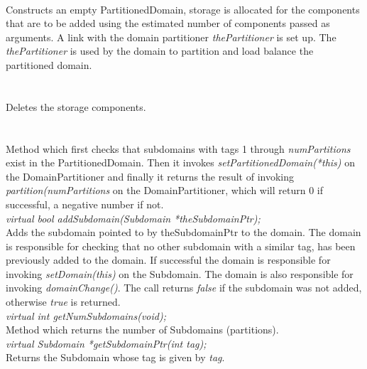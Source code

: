  \\ 
Constructs an empty PartitionedDomain, storage is allocated for the components
that are to be added using the estimated number of components passed
as arguments. A link with the domain partitioner {\em thePartitioner}
is set up. The {\em thePartitioner} is used by the domain to partition
and load balance the partitioned domain. \\


  \\
  \\
Deletes the storage components. \\

  \\
\\
Method which first checks that subdomains with tags 1 through {\em numPartitions} exist in the 
PartitionedDomain. Then it invokes {\em setPartitionedDomain(*this)} on the DomainPartitioner
and finally it returns the result of invoking {\em partition(numPartitions} on
the DomainPartitioner, which will return 0 if successful, a negative number if not. \\

{\em virtual bool addSubdomain(Subdomain *theSubdomainPtr);}  \\
Adds the subdomain pointed to by theSubdomainPtr to the domain. The domain
is responsible for checking that no other subdomain with a similar tag,
has been previously added to the domain. If successful
the domain is responsible for invoking {\em setDomain(this)} on the
Subdomain. The domain is also responsible for invoking {\em
domainChange()}. The call returns {\em false} if the subdomain was not added, 
otherwise {\em true} is returned. \\  

{\em virtual int getNumSubdomains(void);}\\
Method which returns the number of Subdomains (partitions). \\

{\em virtual Subdomain *getSubdomainPtr(int tag);}\\
Returns the Subdomain whose tag is given by {\em tag}. \\

